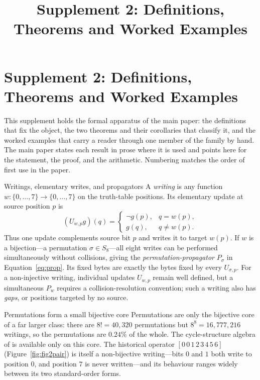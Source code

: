 \documentclass[man,12pt,floatsintext,donotrepeattitle]{apa7}
\title{Supplement 2: Definitions, Theorems and Worked Examples}
\newcommand{\sig}{\sigma}
\newcommand{\secref}[1]{\emph{\nameref{#1}}}
\begin{document}
\part*{Supplement 2: Definitions, Theorems and Worked Examples}

This supplement holds the formal apparatus of the main paper: the definitions
that fix the object, the two theorems and their corollaries that classify it,
and the worked examples that carry a reader through one member of the family by
hand. The main paper states each result in prose where it is used and points
here for the statement, the proof, and the arithmetic. Numbering matches the
order of first use in the paper.


\begin{definition}[label={def:writing}]{Writings, elementary writes, and propagators}
A \emph{writing} is any function $w\colon\{0,\dots,7\}\to\{0,\dots,7\}$ on the
truth-table positions. Its elementary update at source position $p$ is
\[
(U_{w,p}g)(q)=
\begin{cases}
\lnot g(p),&q=w(p),\\
g(q),&q\ne w(p).
\end{cases}
\]
Thus one update complements source bit $p$ and writes it to target $w(p)$. If
$w$ is a bijection---a permutation $\sig\in S_8$---all eight writes can be
performed simultaneously without collisions, giving the
\emph{permutation-propagator} $P_\sig$ in Equation~\eqref{eq:prop}. Its fixed
bytes are exactly the bytes fixed by every $U_{\sig,p}$. For a non-injective
writing, individual updates $U_{w,p}$ remain well defined, but a simultaneous
$P_w$ requires a collision-resolution convention; such a writing also has
\emph{gaps}, or positions targeted by no source.
\end{definition}

\begin{observation}[label={obs:core}]{Permutations form a small bijective core}
Permutations are only the bijective core of a far larger class: there are
$8!=40{,}320$ permutations but $8^{8}=16{,}777{,}216$ writings, so the
permutations are $0.24\%$ of the whole. The cycle-structure algebra of
\secref{sec:classification} is available only on this core. The historical
operator $[0\,0\,1\,2\,3\,4\,5\,6]$ (Figure~\ref{fig:fig2pair}) is itself a
non-bijective writing---bits $0$ and $1$ both write to position $0$, and
position $7$ is never written---and its behaviour ranges widely between its two
standard-order forms.
\end{observation}
\end{document}
